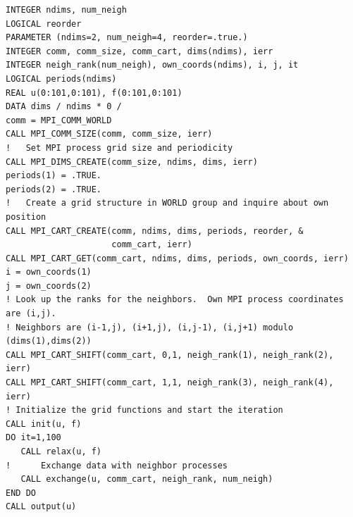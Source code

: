 \begin{example}
\begin{lstlisting}[language={[MPI]Fortran},basicstyle=\lstsmall,caption={Set-up of \MPI/ process structure for two-dimensional parallel Poisson solver},label=poisson-begin]
INTEGER ndims, num_neigh
LOGICAL reorder
PARAMETER (ndims=2, num_neigh=4, reorder=.true.)
INTEGER comm, comm_size, comm_cart, dims(ndims), ierr
INTEGER neigh_rank(num_neigh), own_coords(ndims), i, j, it
LOGICAL periods(ndims)
REAL u(0:101,0:101), f(0:101,0:101)
DATA dims / ndims * 0 /
comm = MPI_COMM_WORLD
CALL MPI_COMM_SIZE(comm, comm_size, ierr)
!   Set MPI process grid size and periodicity
CALL MPI_DIMS_CREATE(comm_size, ndims, dims, ierr)
periods(1) = .TRUE.
periods(2) = .TRUE.
!   Create a grid structure in WORLD group and inquire about own position
CALL MPI_CART_CREATE(comm, ndims, dims, periods, reorder, &
                     comm_cart, ierr)
CALL MPI_CART_GET(comm_cart, ndims, dims, periods, own_coords, ierr)
i = own_coords(1)
j = own_coords(2)
! Look up the ranks for the neighbors.  Own MPI process coordinates are (i,j).
! Neighbors are (i-1,j), (i+1,j), (i,j-1), (i,j+1) modulo (dims(1),dims(2))
CALL MPI_CART_SHIFT(comm_cart, 0,1, neigh_rank(1), neigh_rank(2), ierr)
CALL MPI_CART_SHIFT(comm_cart, 1,1, neigh_rank(3), neigh_rank(4), ierr)
! Initialize the grid functions and start the iteration
CALL init(u, f)
DO it=1,100
   CALL relax(u, f)
!      Exchange data with neighbor processes
   CALL exchange(u, comm_cart, neigh_rank, num_neigh)
END DO
CALL output(u)
\end{lstlisting}



\end{example}
